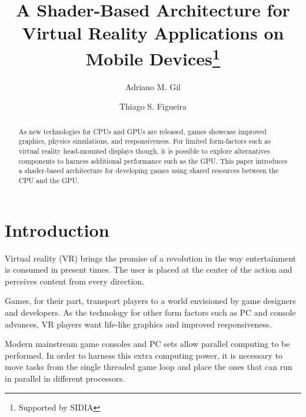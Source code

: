 \documentclass[runningheads]{llncs}
\begin{document}
%
\title{A Shader-Based Architecture for Virtual Reality Applications on Mobile Devices\thanks{Supported by SIDIA}}
%
%
\author{Adriano M. Gil \and Thiago S. Figueira}
%
%
%
\maketitle              %
%
\begin{abstract}
As new technologies for CPUs and GPUs are released, games showcase improved graphics, physics simulations, and responsiveness. For limited form-factors such as virtual reality head-mounted displays though, it is possible  to explore alternatives components to harness additional performance such as the GPU. This paper introduces a shader-based architecture for developing games using shared resources between the CPU and the GPU.

\end{abstract}
%
%
%
\section{Introduction}

Virtual reality (VR) brings the promise of a revolution in the way entertainment is consumed in present times. The user is placed at the center of the action and perceives content from every direction.

Games, for their part, transport players to a world envisioned by game designers and developers. As the technology for other form factors such as PC and console advances, VR players want life-like graphics and improved responsiveness.

Modern mainstream game consoles and PC sets allow parallel computing to be performed. In order to harness this extra computing power, it is necessary to move tasks from the single threaded game loop and place the ones that can run in parallel in different processors.
\end{document}
